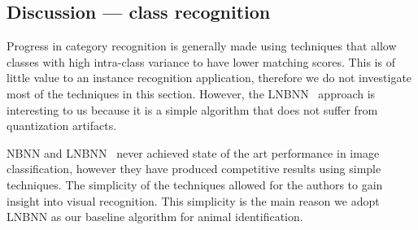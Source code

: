     \subsection{Discussion --- class recognition}

        Progress in category recognition is generally made using
          techniques that allow classes with high intra-class variance to
          have lower matching scores.
        This is of little value to an instance recognition application,
          therefore we do not investigate most of the techniques in this
          section.
        However, the LNBNN~\cite{mccann_local_2012} approach is
          interesting to us because it is a simple algorithm that does
          not suffer from quantization artifacts.

        NBNN and LNBNN~\cite{boiman_defense_2008,mccann_local_2012}
          never achieved state of the art performance in image
          classification, however they have produced competitive results
          using simple techniques.
        The simplicity of the techniques allowed for the authors to
          gain insight into visual recognition.
        This simplicity is the main reason we adopt LNBNN as our
          baseline algorithm for animal identification.

